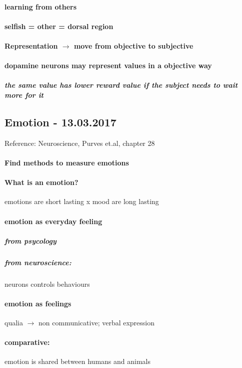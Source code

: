 \documentclass[12pt,article,oneside,a4paper]{memoir}
\begin{document}
\paragraph{learning from others}
\paragraph{selfish = other = dorsal region}

\paragraph{Representation $\rightarrow$ move from objective to subjective}
\paragraph{dopamine neurons may represent values in a objective way}
\subparagraph{the same value has lower reward value if the subject needs to wait more for it}

\subsection{Emotion - 13.03.2017}
Reference: Neuroscience, Purves et.al, chapter 28

\paragraph{Find methods to measure emotions}
\paragraph{What is an emotion?} emotions are short lasting x mood are long lasting
\paragraph{emotion as everyday feeling}
\subparagraph{from psycology}
\subparagraph{from neuroscience:} neurons controls behaviours
\paragraph{emotion as feelings} qualia $\rightarrow$ non communicative; verbal expression
\paragraph{comparative:} emotion is shared between humans and animals
\end{document}
